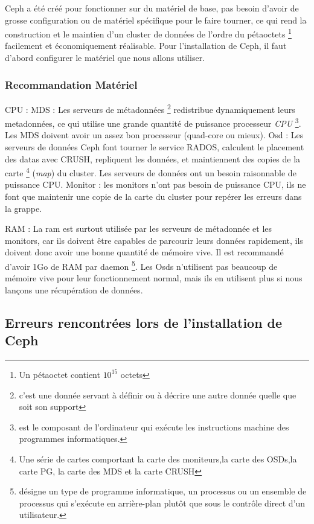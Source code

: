 \documentclass[12pt]{article}
\begin{document}
	Ceph a été créé pour fonctionner sur du matériel de base, pas besoin d'avoir de grosse configuration ou de matériel spécifique pour le faire tourner, ce qui rend la construction et le maintien d'un cluster de données de l'ordre du pétaoctets \footnote{Un pétaoctet contient \begin{math}10^{15}\end{math} octets} facilement et économiquement réalisable.
	Pour l'installation de Ceph, il faut d'abord configurer le matériel que nous allons utiliser.

 \subsubsection{Recommandation Matériel }	
	
	CPU :
	MDS : Les serveurs de métadonnées \footnote{c'est une donnée servant à définir ou à décrire une autre donnée quelle que soit son support} redistribue dynamiquement leurs metadonnées, ce qui utilise une grande quantité de puissance processeur \textit{CPU} \footnote{est le composant de l'ordinateur qui exécute les instructions machine des programmes informatiques.}. Les MDS doivent avoir un assez bon processeur (quad-core ou mieux).
	Osd : Les serveurs de données Ceph font tourner le service RADOS, calculent le placement des datas avec CRUSH, repliquent les données, et maintiennent des copies de la carte \footnote{Une série de cartes comportant la carte des moniteurs,la carte des OSDs,la carte PG, la carte des MDS et la carte CRUSH} (\textit{map}) du cluster. Les serveurs de données ont un besoin raisonnable de puissance CPU.
	Monitor : les monitors n'ont pas besoin de puissance CPU, ils ne font que maintenir une copie de la carte du cluster pour repérer les erreurs dans la grappe.
	
	RAM :
	La ram est surtout utilisée par les serveurs de métadonnée et les monitors, car ils doivent être capables de parcourir leurs données rapidement, ils doivent donc avoir une bonne quantité de mémoire vive. Il est recommandé d'avoir 1Go de RAM par daemon \footnote{désigne un type de programme informatique, un processus ou un ensemble de processus qui s'exécute en arrière-plan plutôt que sous le contrôle direct d'un utilisateur.}.
	Les Osds n'utilisent pas beaucoup de mémoire vive pour leur fonctionnement normal, mais ils en utilisent plus si nous lançons une récupération de données.
	
	\subsection{Erreurs rencontrées lors de l'installation de Ceph}
\end{document}
